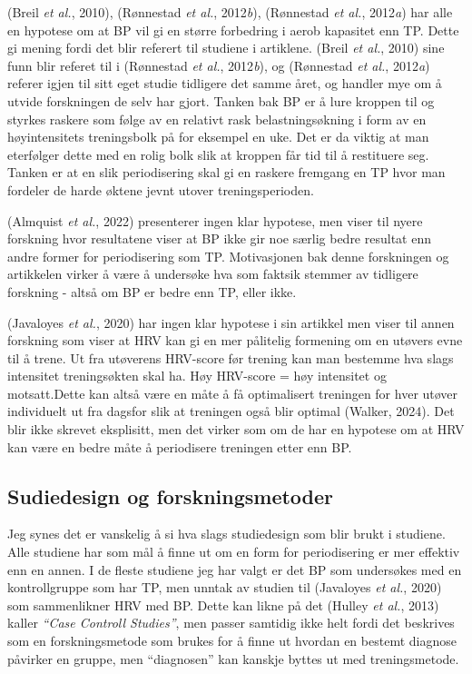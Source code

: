 \documentclass[
  letterpaper,
  DIV=11,
  numbers=noendperiod]{scrreprt}
\begin{document}
(Breil \emph{et al.}, 2010), (Rønnestad \emph{et al.}, 2012\emph{b}),
(Rønnestad \emph{et al.}, 2012\emph{a}) har alle en hypotese om at BP
vil gi en større forbedring i aerob kapasitet enn TP. Dette gi mening
fordi det blir referert til studiene i artiklene. (Breil \emph{et al.},
2010) sine funn blir referet til i (Rønnestad \emph{et al.},
2012\emph{b}), og (Rønnestad \emph{et al.}, 2012\emph{a}) referer igjen
til sitt eget studie tidligere det samme året, og handler mye om å
utvide forskningen de selv har gjort. Tanken bak BP er å lure kroppen
til og styrkes raskere som følge av en relativt rask belastningsøkning i
form av en høyintensitets treningsbolk på for eksempel en uke. Det er da
viktig at man eterfølger dette med en rolig bolk slik at kroppen får tid
til å restituere seg. Tanken er at en slik periodisering skal gi en
raskere fremgang en TP hvor man fordeler de harde øktene jevnt utover
treningsperioden.

(Almquist \emph{et al.}, 2022) presenterer ingen klar hypotese, men
viser til nyere forskning hvor resultatene viser at BP ikke gir noe
særlig bedre resultat enn andre former for periodisering som TP.
Motivasjonen bak denne forskningen og artikkelen virker å være å
undersøke hva som faktsik stemmer av tidligere forskning - altså om BP
er bedre enn TP, eller ikke.

(Javaloyes \emph{et al.}, 2020) har ingen klar hypotese i sin artikkel
men viser til annen forskning som viser at HRV kan gi en mer pålitelig
formening om en utøvers evne til å trene. Ut fra utøverens HRV-score før
trening kan man bestemme hva slags intensitet treningsøkten skal ha. Høy
HRV-score = høy intensitet og motsatt.Dette kan altså være en måte å få
optimalisert treningen for hver utøver individuelt ut fra dagsfor slik
at treningen også blir optimal (Walker, 2024). Det blir ikke skrevet
eksplisitt, men det virker som om de har en hypotese om at HRV kan være
en bedre måte å periodisere treningen etter enn BP.

\subsection{Sudiedesign og
forskningsmetoder}\label{sudiedesign-og-forskningsmetoder}

Jeg synes det er vanskelig å si hva slags studiedesign som blir brukt i
studiene. Alle studiene har som mål å finne ut om en form for
periodisering er mer effektiv enn en annen. I de fleste studiene jeg har
valgt er det BP som undersøkes med en kontrollgruppe som har TP, men
unntak av studien til (Javaloyes \emph{et al.}, 2020) som sammenlikner
HRV med BP. Dette kan likne på det (Hulley \emph{et al.}, 2013) kaller
\emph{``Case Controll Studies''}, men passer samtidig ikke helt fordi
det beskrives som en forskningsmetode som brukes for å finne ut hvordan
en bestemt diagnose påvirker en gruppe, men ``diagnosen'' kan kanskje
byttes ut med treningsmetode.
\end{document}
